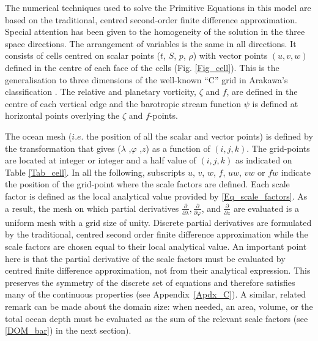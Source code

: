 \documentclass[NEMO_book]{subfiles}
\begin{document}
The numerical techniques used to solve the Primitive Equations in this model are 
based on the traditional, centred second-order finite difference approximation. 
Special attention has been given to the homogeneity of the solution in the three 
space directions. The arrangement of variables is the same in all directions. 
It consists of cells centred on scalar points ($t$, $S$, $p$, $\rho$) with vector 
points $(u, v, w)$ defined in the centre of each face of the cells (Fig. \ref{Fig_cell}). 
This is the generalisation to three dimensions of the well-known ``C'' grid in 
Arakawa's classification \citep{Mesinger_Arakawa_Bk76}. The relative and 
planetary vorticity, $\zeta$ and $f$, are defined in the centre of each vertical edge 
and the barotropic stream function $\psi$ is defined at horizontal points overlying 
the $\zeta$ and $f$-points.

The ocean mesh ($i.e.$ the position of all the scalar and vector points) is defined 
by the transformation that gives ($\lambda$ ,$\varphi$ ,$z$) as a function of $(i,j,k)$. 
The grid-points are located at integer or integer and a half value of $(i,j,k)$ as 
indicated on Table \ref{Tab_cell}. In all the following, subscripts $u$, $v$, $w$, 
$f$, $uw$, $vw$ or $fw$ indicate the position of the grid-point where the scale 
factors are defined. Each scale factor is defined as the local analytical value 
provided by \eqref{Eq_scale_factors}. As a result, the mesh on which partial 
derivatives $\frac{\partial}{\partial \lambda}, \frac{\partial}{\partial \varphi}$, and 
$\frac{\partial}{\partial z} $ are evaluated is a uniform mesh with a grid size of unity. 
Discrete partial derivatives are formulated by the traditional, centred second order 
finite difference approximation while the scale factors are chosen equal to their 
local analytical value. An important point here is that the partial derivative of the 
scale factors must be evaluated by centred finite difference approximation, not 
from their analytical expression. This preserves the symmetry of the discrete set 
of equations and therefore satisfies many of the continuous properties (see 
Appendix~\ref{Apdx_C}). A similar, related remark can be made about the domain 
size: when needed, an area, volume, or the total ocean depth must be evaluated 
as the sum of the relevant scale factors (see \eqref{DOM_bar}) in the next section). 
\end{document}
